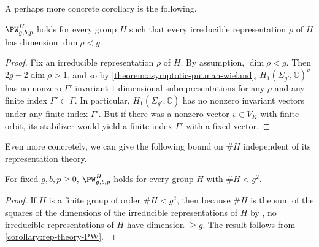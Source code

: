 A perhaps more concrete corollary is the following.
\begin{corollary}
\notready
	\label{corollary:rep-theory-PW}
	$\PW_{g,b,p}^H$ holds for every group $H$
	such that every irreducible representation $\rho$ of $H$ has dimension
	$\dim \rho < g$.
\end{corollary}
\begin{proof}
	Fix an irreducible representation $\rho$ of $H$. By assumption, $\dim \rho < g$. Then
	$2g - 2\dim \rho > 1$, and so by
	\autoref{theorem:asymptotic-putman-wieland},
	$H_1(\Sigma_{g'},\mathbb C)^\rho$ has no nonzero $\Gamma'$-invariant $1$-dimensional subrepresentations for any $\rho$ and any finite index $\Gamma'\subset\Gamma$.
	In particular, $H_1(\Sigma_{g'},\mathbb C)$ has no nonzero invariant
	vectors under any finite index $\Gamma'$. But if there was a nonzero vector $v\in V_K$ with finite orbit, its stabilizer would yield a finite index $\Gamma'$ with a fixed vector.
\end{proof}
Even more concretely, we can give the following bound on $\#H$ independent of its
representation theory.
\begin{corollary}
\notready
	\label{corollary:asymptotic-putman-wieland}
	For fixed $g, b, p \geq 0$,
	$\PW_{g,b,p}^H$ holds for every group $H$ with $\# H < g^2$.
\end{corollary}
\begin{proof}
	If $H$ is a finite group of order $\# H < g^2$, then because $\#
	H$ is the sum of the squares of the dimensions of the irreducible representations of
	$H$ by \cite[(2.19)]{fultonH:representation-theory},
	no irreducible representations of $H$ have
	dimension $\geq g$. The result follows
	from \autoref{corollary:rep-theory-PW}.
\end{proof}


